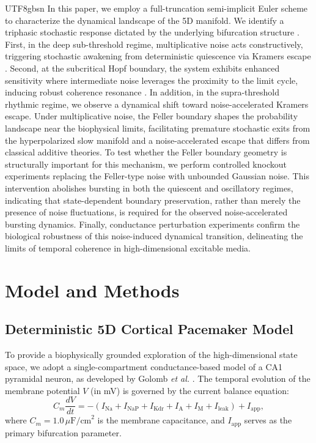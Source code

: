 ﻿\documentclass[reprint, amsmath, amssymb, aps, pre]{revtex4-2}
\begin{document}
\begin{CJK*}{UTF8}{gbsn}
In this paper, we employ a full-truncation semi-implicit Euler scheme to characterize the dynamical landscape of the 5D manifold. We identify a triphasic stochastic response dictated by the underlying bifurcation structure \cite{ermentrout2010mathematical}. First, in the deep sub-threshold regime, multiplicative noise acts constructively, triggering stochastic awakening from deterministic quiescence via Kramers escape \cite{hanggi1990reaction}. Second, at the subcritical Hopf boundary, the system exhibits enhanced sensitivity where intermediate noise leverages the proximity to the limit cycle, inducing robust coherence resonance \cite{pikovsky1997coherence}. In addition, in the supra-threshold rhythmic regime, we observe a dynamical shift toward noise-accelerated Kramers escape. Under multiplicative noise, the Feller boundary shapes the probability landscape near the biophysical limits, facilitating premature stochastic exits from the hyperpolarized slow manifold and a noise-accelerated escape that differs from classical additive theories. To test whether the Feller boundary geometry is structurally important for this mechanism, we perform controlled knockout experiments replacing the Feller-type noise with unbounded Gaussian noise. This intervention abolishes bursting in both the quiescent and oscillatory regimes, indicating that state-dependent boundary preservation, rather than merely the presence of noise fluctuations, is required for the observed noise-accelerated bursting dynamics. Finally, conductance perturbation experiments confirm the biological robustness of this noise-induced dynamical transition, delineating the limits of temporal coherence in high-dimensional excitable media.


\section{Model and Methods}
\label{sec:methods}

\subsection{Deterministic 5D Cortical Pacemaker Model}
To provide a biophysically grounded exploration of the high-dimensional state space, we adopt a single-compartment conductance-based model of a CA1 pyramidal neuron, as developed by Golomb \textit{et al.} \cite{golomb2006contribution}. The temporal evolution of the membrane potential $V$ (in mV) is governed by the current balance equation:
\begin{equation}
C_m \frac{dV}{dt} = - (I_{\mathrm{Na}} + I_{\mathrm{NaP}} + I_{\mathrm{Kdr}} + I_{\mathrm{A}} + I_{\mathrm{M}} + I_{\mathrm{leak}}) + I_{\mathrm{app}},
\label{eq:voltage_balance}
\end{equation}
where $C_m = 1.0 \, \mu\text{F/cm}^2$ is the membrane capacitance, and $I_{\mathrm{app}}$ serves as the primary bifurcation parameter. 


\end{CJK*}
\end{document}
